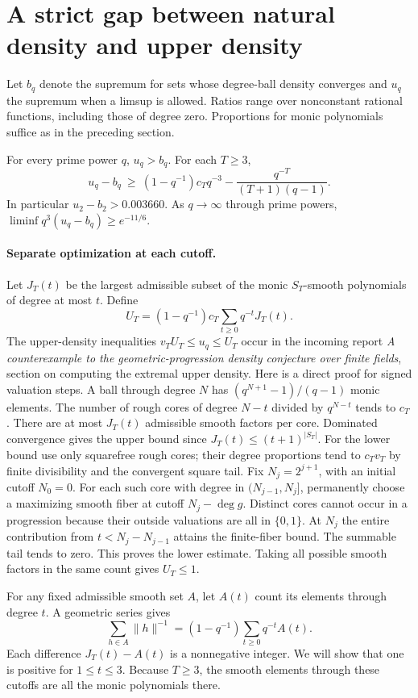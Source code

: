 \section{A strict gap between natural density and upper density}
\label{sec:gap}
Let $b_q$ denote the supremum for sets whose degree-ball density converges and $u_q$ the supremum when a limsup is allowed. Ratios range over nonconstant rational functions, including those of degree zero. Proportions for monic polynomials suffice as in the preceding section.

\begin{theorem}\label{th:gap}
For every prime power $q$, $u_q>b_q$. For each $T\ge3$,
\[
 u_q-b_q\ \ge\ (1-q^{-1}) c_T q^{-3}
            -\frac{q^{-T}}{(T+1)(q-1)} .
\]
In particular $u_2-b_2>0.003660$. As $q\to\infty$ through prime powers, $\liminf q^3(u_q-b_q)\ge e^{-11/6}$.
\end{theorem}

\paragraph{Separate optimization at each cutoff.}
Let $J_T(t)$ be the largest admissible subset of the monic $S_T$-smooth polynomials of degree at most $t$. Define
\[
 U_T=(1-q^{-1})c_T\sum_{t\ge0}q^{-t}J_T(t).
\]
The upper-density inequalities $v_T U_T\le u_q\le U_T$ occur in the incoming report \emph{A counterexample to the geometric-progression density conjecture over finite fields}, section on computing the extremal upper density. Here is a direct proof for signed valuation steps. A ball through degree $N$ has $(q^{N+1}-1)/(q-1)$ monic elements. The number of rough cores of degree $N-t$ divided by $q^{N-t}$ tends to $c_T$. There are at most $J_T(t)$ admissible smooth factors per core. Dominated convergence gives the upper bound since $J_T(t)\le(t+1)^{|S_T|}$. For the lower bound use only squarefree rough cores; their degree proportions tend to $c_Tv_T$ by finite divisibility and the convergent square tail. Fix $N_j=2^{j+1}$, with an initial cutoff $N_0=0$. For each such core with degree in $(N_{j-1},N_j]$, permanently choose a maximizing smooth fiber at cutoff $N_j-\deg g$. Distinct cores cannot occur in a progression because their outside valuations are all in $\{0,1\}$. At $N_j$ the entire contribution from $t<N_j-N_{j-1}$ attains the finite-fiber bound. The summable tail tends to zero. This proves the lower estimate. Taking all possible smooth factors in the same count gives $U_T\le1$.

For any fixed admissible smooth set $A$, let $A(t)$ count its elements through degree $t$. A geometric series gives
\[
 \sum_{h\in A}\|h\|^{-1}=(1-q^{-1})\sum_{t\ge0}q^{-t}A(t).
\]
Each difference $J_T(t)-A(t)$ is a nonnegative integer. We will show that one is positive for $1\le t\le3$. Because $T\ge3$, the smooth elements through these cutoffs are all the monic polynomials there.

